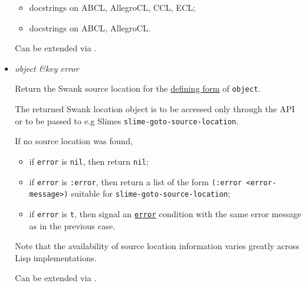 \begin{itemize}
  \begin{itemize}
  \item
    docstrings on ABCL, AllegroCL, CCL, ECL;
  \item
    docstrings on ABCL, AllegroCL.
  \end{itemize}

  Can be extended via
  .
\item
  \label{x-28DREF-3ASOURCE-LOCATION-20FUNCTION-29}
  \emph{object \&key error}

  Return the Swank source location for the
  \href{http://www.lispworks.com/documentation/HyperSpec/Body/26_glo_d.htm\#defining_form}{defining
  form} of \texttt{object}.

  The returned Swank location object is to be accessed only through the
   API or to be passed to e.g Slime\textquotesingle s
  \texttt{slime-goto-source-location}.

  If no source location was found,

  \begin{itemize}
  \item
    if \texttt{error} is \texttt{nil}, then return \texttt{nil};
  \item
    if \texttt{error} is \texttt{:error}, then return a list of the form
    \texttt{(:error\ \textless{}error-message\textgreater{})} suitable
    for \texttt{slime-goto-source-location};
  \item
    if \texttt{error} is \texttt{t}, then signal an
    \href{http://www.lispworks.com/documentation/HyperSpec/Body/e_error.htm}{\texttt{error}}
    condition with the same error message as in the previous case.
  \end{itemize}

  Note that the availability of source location information varies
  greatly across Lisp implementations.

  Can be extended via
  .
\end{itemize}

